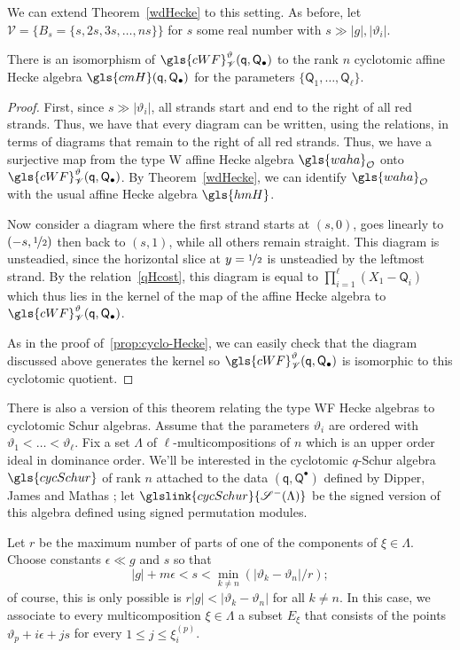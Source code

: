 \documentclass[ALCO,ThmDefs,Unicode,epreuves]{cedram}
\newcommand{\wellsep}{\mathscr{V}}
\newcommand{\ck}{g}
\newcommand{\pq}{\mathsf{q}}
\newcommand{\PQ}{\mathsf{Q}}
\newcommand{\cO}{\mathcal{O}}
\newcommand{\waha}{\gls{waha}}
\newcommand{\hmH}{\gls{hmH}}
\begin{document}
We can extend Theorem~\ref{wdHecke} to this setting. As before, let
$\wellsep=\{B_s=\{s,2s,3s,\dots, ns\}\}$ for $s$ some real
number with $s\gg |\ck|,|\vartheta_i|$. 
\begin{theorem}\label{wfHecke}
 There is an isomorphism of $\gls{cWF}^\vartheta_\wellsep
 (\pq,\PQ_{\bullet})$ to the rank $n$ cyclotomic affine Hecke algebra
 $\gls{cmH}(\pq,\PQ_\bullet)$ for the 
 parameters $\{\PQ_1,\dots, \PQ_\ell\}$. 
\end{theorem}
\begin{proof}
 First, since $s\gg |\vartheta_i|$, all strands start and end to the
 right of all red strands. Thus, we have that every diagram can be
 written, using the relations, in terms of diagrams that remain to
 the right of all red strands. Thus, we have a surjective map from
 the type W affine Hecke algebra $\waha_\cO$ onto $\gls{cWF}^\vartheta_\wellsep
 (\pq,\PQ_{\bullet})$. 
By Theorem~\ref{wdHecke}, we can identify $\waha_\cO$ with the usual
affine Hecke algebra $\hmH$. 

Now consider a diagram
where the first strand starts at $(s,0)$, goes linearly to
$(-s,\nicefrac 12)$ then back to $(s,1)$, while all others remain
straight. This diagram is unsteadied, since the horizontal slice at
$y=\nicefrac{1}2$ is unsteadied by the leftmost strand. By the relation~\eqref{qHcost}, this diagram is equal to $\prod_{i=1}^\ell
 (X_1-\PQ_i)$ which thus lies in the kernel of the map of the affine
 Hecke algebra to $\gls{cWF}^\vartheta_\wellsep
 (\pq,\PQ_{\bullet})$. 

 As in the proof of~\ref{prop:cyclo-Hecke}, we can easily check that
 the diagram discussed above generates the kernel so $\gls{cWF}^\vartheta_\wellsep (\pq,\PQ_{\bullet})$ is isomorphic to
 this cyclotomic quotient.
\end{proof}

There is also a version of this theorem relating the type WF Hecke
algebras to cyclotomic Schur algebras. Assume that the parameters
$\vartheta_i$ are ordered with $\vartheta_1<\dots <\vartheta_\ell$.
Fix a set $\Lambda$ of $\ell$-multicompositions of $n$ which is an
upper order ideal in dominance order. We'll be interested in the
cyclotomic $q$-Schur algebra $\gls{cycSchur}$ of rank $n$ attached to the
data $(\pq,\PQ^\bullet)$ defined by Dipper, James and Mathas
\cite[6.1]{DJM}; let $ \glslink{cycSchur}{\mathscr{S}^-(\Lambda)}$ be the signed version of
this algebra defined using signed permutation modules.

Let $r$ be
the maximum number of parts of one of the components of $\xi\in
\Lambda$. Choose constants $\epsilon \ll \ck$ and $s$ so
that \[|\ck|+m\epsilon < s < \min_{k\neq
 n}(|\vartheta_k-\vartheta_n|/r);\] of course, this is only possible
is $r|\ck| <|\vartheta_k-\vartheta_n|$ for all $k\neq n$. In this
case, we associate to every multicomposition $\xi\in \Lambda$ a subset $E_\xi$
that consists of the points $\vartheta_p+i\epsilon+js$ for every
$1\leq j\leq \xi^{(p)}_i$.
\end{document}
